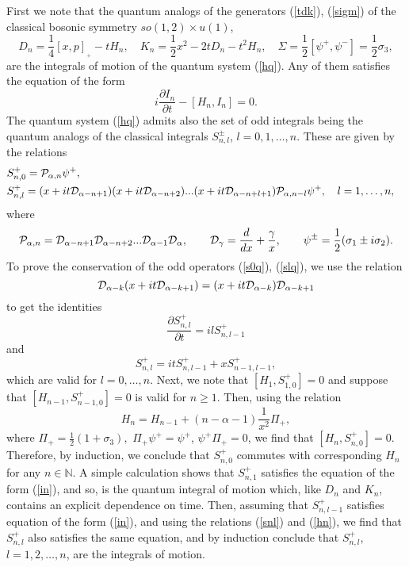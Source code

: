 \documentclass[a4paper,12pt]{article}
\def\N{\mathbb N}
\begin{document}
First we note that
the quantum analogs of the generators
(\ref{tdk}), (\ref{sigm})
of the classical bosonic symmetry $so(1,2)\times u(1)$,
\begin{equation}
D_n=\frac{1}{4}[x,p]_{{}_+}-tH_n,\quad
K_n=\frac{1}{2}x^2-2tD_n-t^2H_n,\quad
\Sigma=\frac{1}{2}[\psi^+,\psi^-]=\frac{1}{2}\sigma_3,
\label{qbos}
\end{equation}
are the integrals of motion of the quantum system
(\ref{hq}). Any of them satisfies the equation of the form
\begin{equation}
i\frac{\partial I_n}{\partial t}-[H_n,I_n]=0.
\label{in}
\end{equation}
The quantum system (\ref{hq}) admits also the set
of odd integrals being the quantum analogs of the
classical integrals $S^\pm_{n,l}$,
$l=0,1,\ldots,n$.
These are given by the relations
\begin{eqnarray}
&S^+_{n,0}={\cal P}_{\alpha, n}\psi^+,&
\label{s0q}\\
&S^+_{n,l}=(x+it{\cal D}_{\alpha -n+1})(x+it{\cal D}_{\alpha
-n+2})...
(x+it{\cal D}_{\alpha -n+l+1})
{\cal P}_{\alpha, n-l}\psi^+,\quad
l=1,\ldots, n,&
\label{slq}
\end{eqnarray}
where
$$
{\cal P}_{\alpha, n} ={\cal D}_{\alpha -n+1}{\cal D}_{\alpha
-n+2}...{\cal D}_{\alpha -1}
{\cal D}_\alpha,\qquad
{\cal D}_\gamma=\frac{d}{dx}+\frac{\gamma}{x},\qquad
\psi^\pm=\frac{1}{2}(\sigma_1\pm i\sigma_2).
$$
To prove the conservation of the odd operators
(\ref{s0q}), (\ref{slq}),
we use the relation
\begin{equation}
{\cal D}_{\alpha -k}(x+it
{\cal D}_{\alpha -k+1})=(x+it
{\cal D}_{\alpha -k}){\cal D}_{\alpha -k+1}
\label{dd}
\end{equation}
to  get the identities
\begin{equation}
\frac{\partial S^+_{n,l}}{\partial t}=ilS^+_{n,l-1}
\label{sl1}
\end{equation}
and
\begin{equation}
S^+_{n,l}=itS^+_{n,l-1}+xS^+_{n-1,l-1},
\label{snl}
\end{equation}
which are valid for $l=0,\ldots, n$.
Next, we note that
$[H_1,S^+_{1,0}]=0$
and suppose that
 $[H_{n-1},S^+_{n-1,0}]=0$
 is valid for $n\geq 1$.
Then, using the relation
\begin{equation}
H_n=H_{n-1}+(n-\alpha-1)\frac{1}{x^2}\Pi_+,
\label{hn}
\end{equation}
where
$
\Pi_+=\frac{1}{2}(1+\sigma_3),
$
$\Pi_+\psi^+=\psi^+$,
$\psi^+\Pi_+=0$,
we find that
$[H_n,S^+_{n,0}]=0$. Therefore, by induction,
we conclude that $S^+_{n,0}$ commutes with
corresponding $H_n$
for any $n\in\N$.
A simple
calculation shows that
$S^+_{n,1}$ satisfies the equation of the form (\ref{in}),
and so, is the quantum integral of motion
which, like $D_n$
and $K_n$, contains
an explicit dependence on time.
Then, assuming that $S^+_{n,l-1}$ satisfies equation
of the form (\ref{in}),
and using the relations (\ref{snl}) and (\ref{hn}),
we find that $S^+_{n,l}$ also satisfies the same equation,
and by induction conclude that
$S^+_{n,l}$, $l=1,2,\ldots, n$,
are the integrals of motion.
\end{document}
